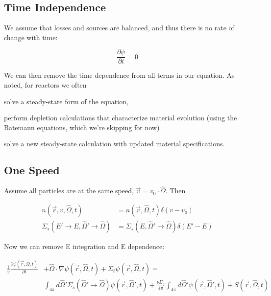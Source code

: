 \documentclass[12pt]{article}
\newcommand{\vOmega}{\ensuremath{\hat{\Omega}}}
\begin{document}
\subsection*{Time Independence}

We assume that losses and sources are balanced, and thus there is no rate of change with time:

\[\frac{\partial \psi}{\partial t} = 0\]

We can then remove the time dependence from all terms in our equation. As 
noted, for reactors we often 

\begin{compactitem}
\item solve a steady-state form of the equation,
\item perform depletion calculations that characterize material evolution
      (using the Batemann equations, which we're skipping for now)
\item solve a new steady-state calculation with updated material 
      specifications.
\end{compactitem}

\subsection*{One Speed}

Assume all particles are at the same speed, $\vec{v} = v_0 \cdot \vOmega$. Then

\begin{align*}
n(\vec{r}, v, \vOmega, t) &= n(\vec{r}, \vOmega, t) \delta(v - v_0) \\
\Sigma_s(E' \rightarrow E, \vOmega' \rightarrow \vOmega) &=
\Sigma_s(E, \vOmega' \rightarrow \vOmega)\delta(E' - E)
\end{align*}

Now we can remove E integration and E dependence:

\begin{align*}
\frac{1}{v}\frac{\partial \psi(\vec{r}, \vOmega, t)}{\partial t} &+ 
\vOmega \cdot \nabla \psi(\vec{r}, \vOmega, t) +
\Sigma_t \psi(\vec{r}, \vOmega, t) = \nonumber\\
%
& \int_{4\pi} d\vOmega' \Sigma_s(\vOmega' \rightarrow \vOmega)
\psi(\vec{r}, \vOmega', t)  
+ \frac{\nu \Sigma_f}{4\pi} \int_{4\pi} d\vOmega' \psi(\vec{r},  \vOmega', t) 
+ S(\vec{r}, \vOmega, t) 
\end{align*}
%
\end{document}
